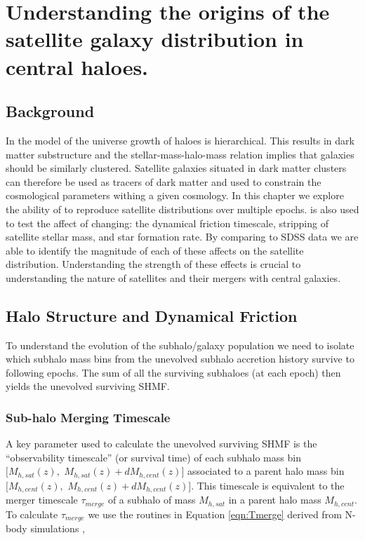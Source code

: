 
\chapter{Understanding the origins of the satellite galaxy distribution in central haloes.} 
\label{Chapter:GalDist}

\section{Background}
In the \LCDM model of the universe growth of haloes is hierarchical.  This results in dark matter substructure and the stellar-mass-halo-mass relation implies that galaxies should be similarly clustered. Satellite galaxies situated in dark matter clusters can therefore be used as tracers of dark matter and used to constrain the cosmological parameters withing a given \LCDM cosmology.
In this chapter we explore the ability of \steel to reproduce satellite distributions over multiple epochs. \steel is also used to test the affect of changing: the dynamical friction timescale, stripping of satellite stellar mass, and star formation rate. By comparing to SDSS data we are able to identify the magnitude of each of these affects on the satellite distribution. Understanding the strength of these effects is crucial to understanding the nature of satellites and their mergers with central galaxies.  

\section{Halo Structure and Dynamical Friction}

To understand the evolution of the subhalo/galaxy population we need to isolate which subhalo mass bins from the unevolved subhalo accretion history survive to following epochs. The sum of all the surviving subhaloes (at each epoch) then yields the unevolved surviving SHMF. 

\subsection{Sub-halo Merging Timescale}
\label{sec:Timescale}
 A key parameter used to calculate the unevolved surviving SHMF is the ``observability timescale'' (or survival time) of each  subhalo mass bin $[M_{h,sat}(z),$ $M_{h,sat}(z) + dM_{h,cent}(z)]$ associated to a parent halo mass bin $[M_{h,cent}(z),$ $M_{h,cent}(z) + dM_{h,cent}(z)]$. This timescale is equivalent to the merger timescale $\tau_{merge}$ of a subhalo of mass $M_{h,sat}$ in a parent halo mass $M_{h,cent}$. To calculate $\tau_{merge}$ we use the routines in Equation \ref{eqn:Tmerge} derived from N-body simulations \citep{Boylan-Kolchin2008},

